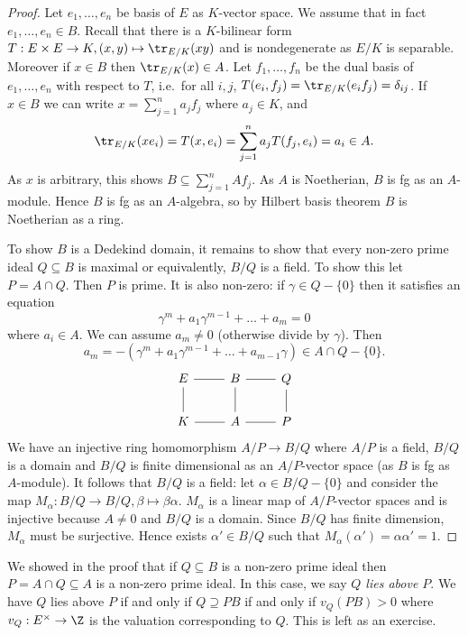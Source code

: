 \documentclass[a4paper]{article}
\begin{document}
\begin{proof}
  Let \(e_1, \dots, e_n\) be basis of \(E\) as \(K\)-vector space. We assume that in fact \(e_1, \dots, e_n \in B\). Recall that there is a \(K\)-bilinear form \(T: E \times E \to K, (x, y) \mapsto \tr_{E/K}(xy)\) and is nondegenerate as \(E/K\) is separable. Moreover if \(x \in B\) then \(\tr_{E/K}(x) \in A\). Let \(f_1, \dots, f_n\) be the dual basis of \(e_1, \dots, e_n\) with respect to \(T\), i.e.\ for all \(i, j\), \(T(e_i, f_j) = \tr_{E/K}(e_if_j) = \delta_{ij}\). If \(x \in B\) we can write \(x = \sum_{j = 1}^n a_jf_j\) where \(a_j \in K\), and
  \[
    \tr_{E/K}(x e_i) = T(x, e_i) = \sum_{j = 1}^n a_j T(f_j, e_i) = a_i \in A.
  \]
  As \(x\) is arbitrary, this shows \(B \subseteq \sum_{j = 1}^n Af_j\). As \(A\) is Noetherian, \(B\) is fg as an \(A\)-module. Hence \(B\) is fg as an \(A\)-algebra, so by Hilbert basis theorem \(B\) is Noetherian as a ring.

  To show \(B\) is a Dedekind domain, it remains to show that every non-zero prime ideal \(Q \subseteq B\) is maximal or equivalently, \(B/Q\) is a field. To show this let \(P = A \cap Q\). Then \(P\) is prime. It is also non-zero: if \(\gamma \in Q - \{0\}\) then it satisfies an equation
  \[
    \gamma^m + a_1 \gamma^{m - 1} + \dots + a_m = 0
  \]
  where \(a_i \in A\). We can assume \(a_m \neq 0\) (otherwise divide by \(\gamma\)). Then
  \[
    a_m = - (\gamma^m + a_1 \gamma^{m - 1} + \dots + a_{m - 1} \gamma) \in A \cap Q - \{0\}.
  \]
  \[
    \begin{tikzcd}
      E \ar[r, dash] \ar[d, dash] & B \ar[r, dash] \ar[d, dash] & Q \ar[d, dash] \\
      K \ar[r, dash] & A \ar[r, dash] & P
    \end{tikzcd}
  \]
  We have an injective ring homomorphism \(A/P \to B/Q\) where \(A/P\) is a field, \(B/Q\) is a domain and \(B/Q\) is finite dimensional as an \(A/P\)-vector space (as \(B\) is fg as \(A\)-module). It follows that \(B/Q\) is a field: let \(\alpha \in B/Q - \{0\}\) and consider the map \(M_\alpha: B/Q \to B/Q, \beta \mapsto \beta\alpha\). \(M_\alpha\) is a linear map of \(A/P\)-vector spaces and is injective because \(A \neq 0\) and \(B/Q\) is a domain. Since \(B/Q\) has finite dimension, \(M_\alpha\) must be surjective. Hence exists \(\alpha' \in B/Q\) such that \(M_\alpha(\alpha') = \alpha\alpha' = 1\).
\end{proof}

We showed in the proof that if \(Q \subseteq B\) is a non-zero prime ideal then \(P = A \cap Q \subseteq A\) is a non-zero prime ideal. In this case, we say \emph{\(Q\) lies above \(P\)}. We have \(Q\) lies above \(P\) if and only if \(Q \supseteq PB\) if and only if \(v_Q(PB) > 0\) where \(v_Q: E^\times \to \Z\) is the valuation corresponding to \(Q\). This is left as an exercise.
\end{document}
